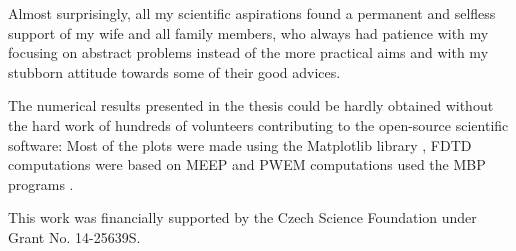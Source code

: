 Almost surprisingly, all my scientific aspirations found a permanent and selfless support of my wife and all family members, who always had patience with my focusing on abstract problems instead of the more practical aims and with my stubborn attitude towards some of their good advices.

The numerical results presented in the thesis could be hardly obtained without the hard work of hundreds of volunteers contributing to the open-source scientific software: Most of the plots were made using the Matplotlib library \cite{hunter2007}, FDTD computations were based on MEEP \cite{oskooi2010meep} and PWEM computations used the MBP programs \cite{johnson2001mpb}. 

This work was financially supported by the Czech Science Foundation under Grant No. 14-25639S.

\thispagestyle{empty} \newpage

